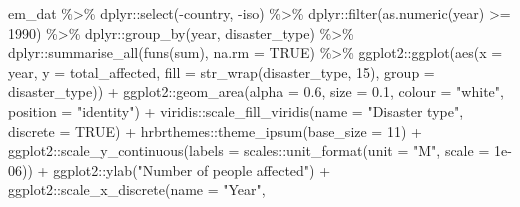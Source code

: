 \documentclass[
  12pt,
]{article}
\newenvironment{Shaded}{}{}
\newcommand{\AttributeTok}[1]{\textcolor[rgb]{0.49,0.56,0.16}{#1}}
\newcommand{\ConstantTok}[1]{\textcolor[rgb]{0.53,0.00,0.00}{#1}}
\newcommand{\DecValTok}[1]{\textcolor[rgb]{0.25,0.63,0.44}{#1}}
\newcommand{\FloatTok}[1]{\textcolor[rgb]{0.25,0.63,0.44}{#1}}
\newcommand{\FunctionTok}[1]{\textcolor[rgb]{0.02,0.16,0.49}{#1}}
\newcommand{\NormalTok}[1]{#1}
\newcommand{\SpecialCharTok}[1]{\textcolor[rgb]{0.25,0.44,0.63}{#1}}
\newcommand{\StringTok}[1]{\textcolor[rgb]{0.25,0.44,0.63}{#1}}
\begin{document}
\begin{Shaded}
\begin{Highlighting}[]
\NormalTok{em\_dat }\SpecialCharTok{\%\textgreater{}\%}
\NormalTok{    dplyr}\SpecialCharTok{::}\FunctionTok{select}\NormalTok{(}\SpecialCharTok{{-}}\NormalTok{country, }\SpecialCharTok{{-}}\NormalTok{iso) }\SpecialCharTok{\%\textgreater{}\%}
\NormalTok{    dplyr}\SpecialCharTok{::}\FunctionTok{filter}\NormalTok{(}\FunctionTok{as.numeric}\NormalTok{(year) }\SpecialCharTok{\textgreater{}=} \DecValTok{1990}\NormalTok{) }\SpecialCharTok{\%\textgreater{}\%}
\NormalTok{    dplyr}\SpecialCharTok{::}\FunctionTok{group\_by}\NormalTok{(year, disaster\_type) }\SpecialCharTok{\%\textgreater{}\%}
\NormalTok{    dplyr}\SpecialCharTok{::}\FunctionTok{summarise\_all}\NormalTok{(}\FunctionTok{funs}\NormalTok{(sum), }\AttributeTok{na.rm =} \ConstantTok{TRUE}\NormalTok{) }\SpecialCharTok{\%\textgreater{}\%}
\NormalTok{    ggplot2}\SpecialCharTok{::}\FunctionTok{ggplot}\NormalTok{(}\FunctionTok{aes}\NormalTok{(}\AttributeTok{x =}\NormalTok{ year, }\AttributeTok{y =}\NormalTok{ total\_affected, }
        \AttributeTok{fill =} \FunctionTok{str\_wrap}\NormalTok{(disaster\_type, }\DecValTok{15}\NormalTok{), }
        \AttributeTok{group =}\NormalTok{ disaster\_type)) }\SpecialCharTok{+}\NormalTok{ ggplot2}\SpecialCharTok{::}\FunctionTok{geom\_area}\NormalTok{(}\AttributeTok{alpha =} \FloatTok{0.6}\NormalTok{, }
    \AttributeTok{size =} \FloatTok{0.1}\NormalTok{, }\AttributeTok{colour =} \StringTok{"white"}\NormalTok{, }\AttributeTok{position =} \StringTok{"identity"}\NormalTok{) }\SpecialCharTok{+} 
\NormalTok{    viridis}\SpecialCharTok{::}\FunctionTok{scale\_fill\_viridis}\NormalTok{(}\AttributeTok{name =} \StringTok{"Disaster type"}\NormalTok{, }
        \AttributeTok{discrete =} \ConstantTok{TRUE}\NormalTok{) }\SpecialCharTok{+}\NormalTok{ hrbrthemes}\SpecialCharTok{::}\FunctionTok{theme\_ipsum}\NormalTok{(}\AttributeTok{base\_size =} \DecValTok{11}\NormalTok{) }\SpecialCharTok{+} 
\NormalTok{    ggplot2}\SpecialCharTok{::}\FunctionTok{scale\_y\_continuous}\NormalTok{(}\AttributeTok{labels =}\NormalTok{ scales}\SpecialCharTok{::}\FunctionTok{unit\_format}\NormalTok{(}\AttributeTok{unit =} \StringTok{"M"}\NormalTok{, }
        \AttributeTok{scale =} \FloatTok{1e{-}06}\NormalTok{)) }\SpecialCharTok{+}\NormalTok{ ggplot2}\SpecialCharTok{::}\FunctionTok{ylab}\NormalTok{(}\StringTok{"Number of people affected"}\NormalTok{) }\SpecialCharTok{+} 
\NormalTok{    ggplot2}\SpecialCharTok{::}\FunctionTok{scale\_x\_discrete}\NormalTok{(}\AttributeTok{name =} \StringTok{"Year"}\NormalTok{, }

\end{Highlighting}
\end{Shaded}
\end{document}
